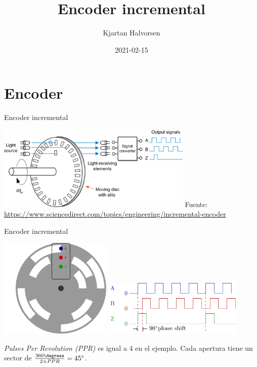 \documentclass[presentation,aspectratio=169]{beamer}
\author{Kjartan Halvorsen}
\date{2021-02-15}
\title{Encoder incremental}
\begin{document}
\maketitle

\section{Encoder}
\label{sec:org432b10b}

\begin{frame}[label={sec:org044eded}]{Encoder incremental}
\begin{center}
\includegraphics[width=0.7\textwidth]{../../figures/encoder-im.jpg}
{\footnotesize Fuente: \url{https://www.sciencedirect.com/topics/engineering/incremental-encoder}}
\end{center}
\end{frame}

\begin{frame}[label={sec:org6b2e07b}]{Encoder incremental}
\begin{center}
\includegraphics[width=0.4\textwidth]{../../figures/encoder-disc}
\includegraphics[width=0.5\textwidth]{../../figures/encoder-signals}
\end{center}

\emph{Pulses Per Revolution (PPR)} es igual a 4 en el ejemplo. Cada apertura tiene un sector de \(\frac{360\degrees}{2 \times PPR} = 45\degree\).
\end{frame}
\end{document}
